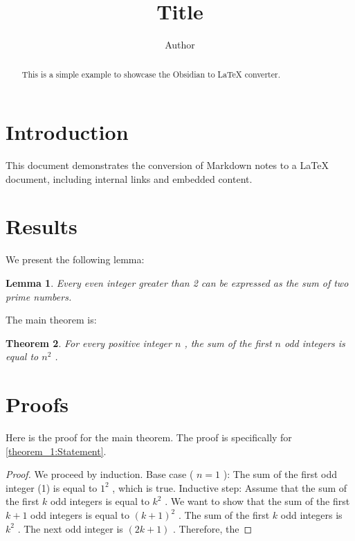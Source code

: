 \documentclass{article}
\title{Title}
\author{Author}
\newtheorem{theorem}{Theorem}
\newtheorem{lemma}[theorem]{Lemma}
\begin{document}
\maketitle
\begin{abstract}
This is a simple example to showcase the Obsidian to LaTeX converter.

\end{abstract}

\section{Introduction}\label{section:Introduction}
This document demonstrates the conversion of Markdown notes to a LaTeX document, including internal links and embedded content.
\section{Results}\label{section:Results}
We present the following lemma:
\begin{lemma}
\label{lemma_1:Statement}
Every even integer greater than 2 can be expressed as the sum of two prime numbers.

\end{lemma}
The main theorem is:
\begin{theorem}
\label{theorem_1:Statement}
For every positive integer  $n$ , the sum of the first  $n$  odd integers is equal to  $n^2$ .

\end{theorem}

\section{Proofs}\label{section:Proofs}
Here is the proof for the main theorem. The proof is specifically for \autoref{theorem_1:Statement}.
\begin{proof}
We proceed by induction.
Base case ( $n = 1$ ): The sum of the first odd integer (1) is equal to  $1^2$ , which is true.
Inductive step: Assume that the sum of the first  $k$  odd integers is equal to  $k^2$ . We want to show that the sum of the first  $k+1$  odd integers is equal to  $(k+1)^2$ .
The sum of the first  $k$  odd integers is  $k^2$ . The next odd integer is  $(2k+1)$ . Therefore, the

\end{proof}
\end{document}
